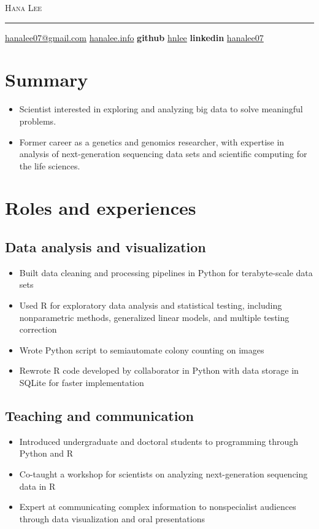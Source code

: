 \documentclass[letterpaper,12pt]{article}
\begin{document}
{\Huge\textsc{Hana Lee}}\\
\rule[1mm]{\textwidth}{0.5pt}

\footnotesize\begin{center}
    \href{hanalee07@gmail.com}{hanalee07@gmail.com}
    \textbullet\enskip\href{http://hanalee.info}{hanalee.info}
    \textbullet\enskip\textbf{github} \href{https://github.com/hnlee}{hnlee}
    \textbullet\enskip\textbf{linkedin} \href{https://www.linkedin.com/in/hanalee07}{hanalee07}
\end{center}

\section*{Summary}
\begin{itemize}
    \item Scientist interested in exploring and analyzing big data to solve meaningful problems.
    \item Former career as a genetics and genomics researcher, with expertise in analysis of next-generation sequencing data sets and scientific computing for the life sciences.
\end{itemize}

\section*{Roles and experiences}

 

\subsection*{Data analysis and visualization}
\begin{itemize}
    \item Built data cleaning and processing pipelines in Python for terabyte-scale data sets
    \item Used R for exploratory data analysis and statistical testing, including nonparametric methods, generalized linear models, and multiple testing correction
    \item Wrote Python script to semiautomate colony counting on images
    \item Rewrote R code developed by collaborator in Python with data storage in SQLite for faster implementation
 \end{itemize}
 
\subsection*{Teaching and communication}
\begin{itemize} 
    \item Introduced undergraduate and doctoral students to programming through Python and R
    \item Co-taught a workshop for scientists on analyzing next-generation sequencing data in R
    \item Expert at communicating complex information to nonspecialist audiences through data visualization and oral presentations
\end{itemize}
\end{document}
